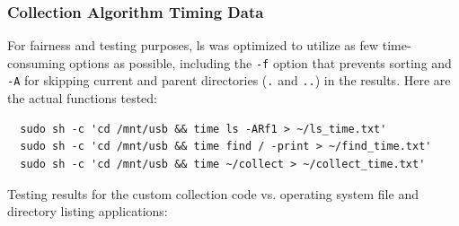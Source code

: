 \documentclass[12pt]{article}
\begin{document}
\subsubsection{Collection Algorithm Timing Data}

For fairness and testing purposes, ls was optimized to utilize as few
time-consuming options as possible, including the {\tt -f} option that
prevents sorting and {\tt -A} for skipping current and parent
directories (\verb|.| and \verb|..|) in the results. Here are the
actual functions tested:

\vspace{0.1 cm}
\begin{verbatim}
  sudo sh -c 'cd /mnt/usb && time ls -ARf1 > ~/ls_time.txt'
  sudo sh -c 'cd /mnt/usb && time find / -print > ~/find_time.txt'
  sudo sh -c 'cd /mnt/usb && time ~/collect > ~/collect_time.txt'
\end{verbatim}
\vspace{0.1 cm}

Testing results for the custom collection code vs. operating system file
and directory listing applications:
\end{document}
